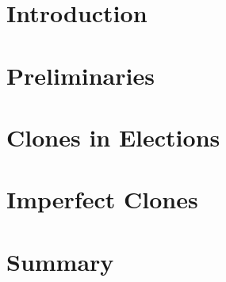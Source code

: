 \documentclass[a4paper,12pt]{report}
\theoremstyle{plain}
\theoremstyle{definition}
\theoremstyle{remark}
\begin{document}
\tableofcontents

\chapter{Introduction} 
\chapter{Preliminaries} 
\chapter{Clones in Elections} 
\chapter{Imperfect Clones} 
\chapter{Summary} 




\end{document}
